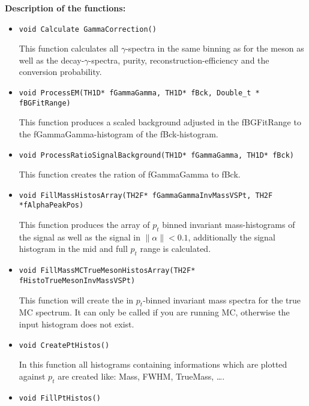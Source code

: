 		\noindent \textbf{Description of the functions:}
		\begin{itemize}
		 \item \begin{lstlisting}
void Calculate GammaCorrection()
		       \end{lstlisting}
			This function calculates all $\gamma$-spectra in the same binning as for the meson as well as the decay-$\gamma$-spectra, purity, reconstruction-efficiency and the conversion probability.
		\item \begin{lstlisting}
void ProcessEM(TH1D* fGammaGamma, TH1D* fBck, Double_t * fBGFitRange)	       	
		      \end{lstlisting}
			This function produces a scaled background adjusted in the fBGFitRange to the fGammaGamma-histogram of the fBck-histogram.
		\item \begin{lstlisting}
void ProcessRatioSignalBackground(TH1D* fGammaGamma, TH1D* fBck)
		      \end{lstlisting}
			This function creates the ration of fGammaGamma to fBck.
		\item \begin{lstlisting}
void FillMassHistosArray(TH2F* fGammaGammaInvMassVSPt, TH2F *fAlphaPeakPos)
		      \end{lstlisting}
			This function produces the array of $p_t$ binned invariant mass-histograms of the signal as well as the signal in $\|\alpha\| < 0.1$, additionally the signal histogram in the mid and full $p_t$ range is calculated.  
		\item \begin{lstlisting}
void FillMassMCTrueMesonHistosArray(TH2F* fHistoTrueMesonInvMassVSPt)
		      \end{lstlisting}
			This function will create the in $p_t$-binned invariant mass spectra for the true MC spectrum. It can only be called if you are running MC, otherwise the input histogram does not exist.
		\item \begin{lstlisting}
void CreatePtHistos()
		      \end{lstlisting}
			In this function all histograms containing informations which are plotted against $p_t$ are created like: Mass, FWHM, TrueMass, \ldots.
		\item \begin{lstlisting}
void FillPtHistos()
		      \end{lstlisting}

\end{itemize}
